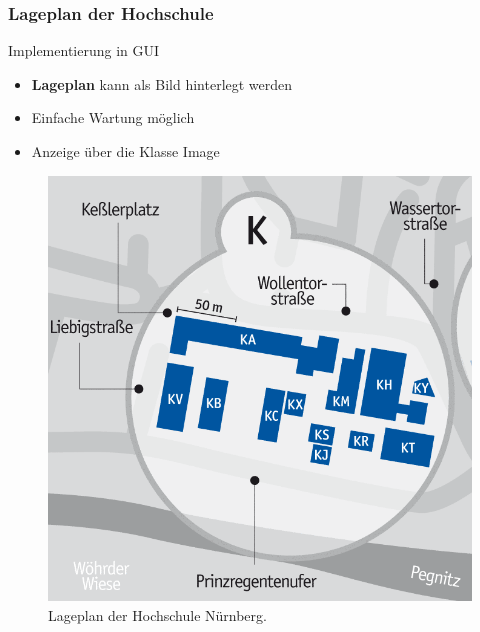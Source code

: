 \begin{frame}
	\frametitle{Lageplan der Hochschule}
%
\begin{minipage}[t]{0.48\textwidth}
	\begin{block}{Implementierung in GUI}
		\begin{itemize}
			\item \textbf{Lageplan} kann als Bild hinterlegt werden
			\item Einfache Wartung möglich
			\item Anzeige über die Klasse Image
		\end{itemize}
	\end{block}
\end{minipage}
\begin{minipage}[t]{0.48\textwidth}
	\begin{figure}
		\includegraphics[width=\textwidth]{../grafiken/lageplan.png}
		\caption{Lageplan der Hochschule Nürnberg.}
	\end{figure}
\end{minipage}
\end{frame}
%
%
%
